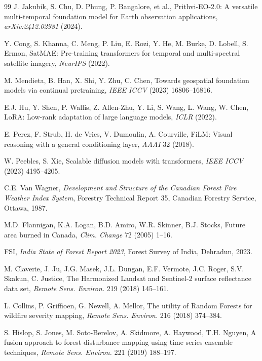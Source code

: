 \documentclass[review,12pt]{elsarticle}
\begin{document}
\begin{thebibliography}{99}
J. Jakubik, S. Chu, D. Phung, P. Bangalore, et al.,
Prithvi-EO-2.0: A versatile multi-temporal foundation model for Earth observation applications,
\textit{arXiv:2412.02981} (2024).

Y. Cong, S. Khanna, C. Meng, P. Liu, E. Rozi, Y. He, M. Burke, D. Lobell, S. Ermon,
SatMAE: Pre-training transformers for temporal and multi-spectral satellite imagery,
\textit{NeurIPS} (2022).

M. Mendieta, B. Han, X. Shi, Y. Zhu, C. Chen,
Towards geospatial foundation models via continual pretraining,
\textit{IEEE ICCV} (2023) 16806--16816.

E.J. Hu, Y. Shen, P. Wallis, Z. Allen-Zhu, Y. Li, S. Wang, L. Wang, W. Chen,
LoRA: Low-rank adaptation of large language models,
\textit{ICLR} (2022).

E. Perez, F. Strub, H. de Vries, V. Dumoulin, A. Courville,
FiLM: Visual reasoning with a general conditioning layer,
\textit{AAAI} 32 (2018).

W. Peebles, S. Xie,
Scalable diffusion models with transformers,
\textit{IEEE ICCV} (2023) 4195--4205.

C.E. Van Wagner,
\textit{Development and Structure of the Canadian Forest Fire Weather Index System},
Forestry Technical Report 35, Canadian Forestry Service, Ottawa, 1987.

M.D. Flannigan, K.A. Logan, B.D. Amiro, W.R. Skinner, B.J. Stocks,
Future area burned in Canada,
\textit{Clim. Change} 72 (2005) 1--16.

FSI,
\textit{India State of Forest Report 2023},
Forest Survey of India, Dehradun, 2023.

M. Claverie, J. Ju, J.G. Masek, J.L. Dungan, E.F. Vermote, J.C. Roger, S.V. Skakun, C. Justice,
The Harmonized Landsat and Sentinel-2 surface reflectance data set,
\textit{Remote Sens. Environ.} 219 (2018) 145--161.

L. Collins, P. Griffioen, G. Newell, A. Mellor,
The utility of Random Forests for wildfire severity mapping,
\textit{Remote Sens. Environ.} 216 (2018) 374--384.

S. Hislop, S. Jones, M. Soto-Berelov, A. Skidmore, A. Haywood, T.H. Nguyen,
A fusion approach to forest disturbance mapping using time series ensemble techniques,
\textit{Remote Sens. Environ.} 221 (2019) 188--197.


\end{thebibliography}
\end{document}
